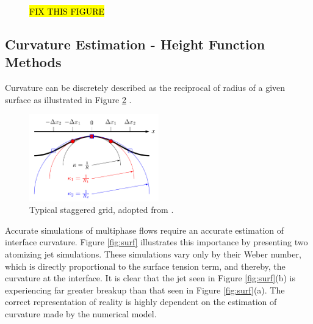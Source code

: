 \begin{figure}[htbp]
		\caption{\hl{FIX THIS FIGURE}}
	\label{fig:rudmesh}
\end{figure}

\subsection{Curvature Estimation - Height Function Methods}

Curvature can be discretely described as the reciprocal of radius of a given surface as illustrated in Figure \ref{fig:curv} \cite{MARK2013}. 

 \begin{figure}[htbp]
	\centering
	\includegraphics[width=0.5\textwidth]{figs/curv}
	\caption{Typical staggered grid, adopted from \cite{TRYG}.}
	\label{fig:curv}
\end{figure}

\noindent Accurate simulations of multiphase flows require an accurate estimation of interface curvature. Figure \ref{fig:surf} illustrates this importance by presenting two atomizing jet simulations. These simulations vary only by their Weber number, which is directly proportional to the surface tension term, and thereby, the curvature at the interface. It is clear that the jet seen in Figure \ref{fig:surf}(b) is experiencing far greater breakup than that seen in Figure \ref{fig:surf}(a). The correct representation of reality is highly dependent on the estimation of curvature made by the numerical model. 

